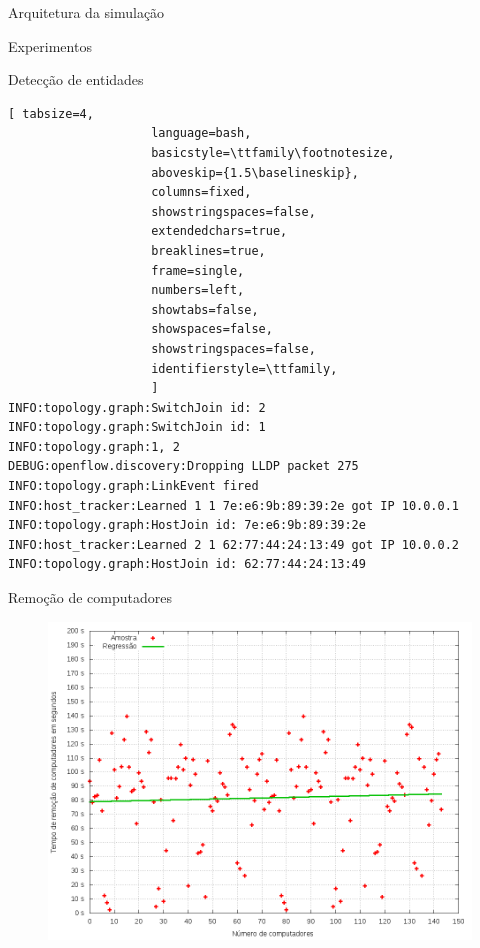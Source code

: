 \begin{frame}{Arquitetura da simulação}

    
\end{frame}


\begin{frame}{Experimentos}
    

\end{frame}


\begin{frame}[fragile]{Detecção de entidades}

\begin{lstlisting}[ tabsize=4,  
                    language=bash,
                    basicstyle=\ttfamily\footnotesize,
                    aboveskip={1.5\baselineskip},
                    columns=fixed,
                    showstringspaces=false,
                    extendedchars=true,
                    breaklines=true,
                    frame=single,
                    numbers=left,
                    showtabs=false,
                    showspaces=false,
                    showstringspaces=false,
                    identifierstyle=\ttfamily,
                    ]
INFO:topology.graph:SwitchJoin id: 2
INFO:topology.graph:SwitchJoin id: 1
INFO:topology.graph:1, 2
DEBUG:openflow.discovery:Dropping LLDP packet 275
INFO:topology.graph:LinkEvent fired
INFO:host_tracker:Learned 1 1 7e:e6:9b:89:39:2e got IP 10.0.0.1
INFO:topology.graph:HostJoin id: 7e:e6:9b:89:39:2e
INFO:host_tracker:Learned 2 1 62:77:44:24:13:49 got IP 10.0.0.2
INFO:topology.graph:HostJoin id: 62:77:44:24:13:49
\end{lstlisting}

\end{frame}


\begin{frame}{Remoção de computadores}

    \begin{figure}[!htb]
        \centering
        \includegraphics[scale=.35]{images/hosts-leave-time}
    \end{figure}

\end{frame}


